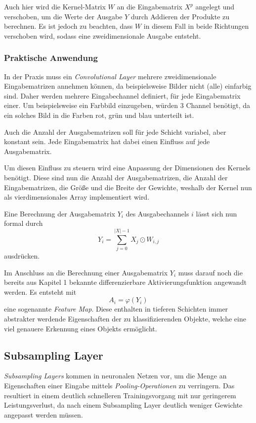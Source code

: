 \documentclass[12pt,a4]{article}
\begin{document}
Auch hier wird die Kernel-Matrix $W$ an die Eingabematrix $X^p$ angelegt und verschoben, um die Werte der Ausgabe $Y$ durch Addieren der Produkte zu berechnen. Es ist jedoch zu beachten, dass $W$ in diesem Fall in beide Richtungen verschoben wird, sodass eine zweidimensionale Ausgabe entsteht.

\subsubsection{Praktische Anwendung}\label{sec:PracticalConvolution}
In der Praxis muss ein \textit{Convolutional Layer} mehrere zweidimensionale Eingabematrizen annehmen können, da beispielsweise Bilder nicht (alle) einfarbig sind. Daher werden mehrere Eingabechannel definiert, für jede Eingabematrix einer. Um beispielsweise ein Farbbild einzugeben, würden 3 Channel benötigt, da ein solches Bild in die Farben rot, grün und blau unterteilt ist.

Auch die Anzahl der Ausgabematrizen soll für jede Schicht variabel, aber konstant sein. Jede Eingabematrix hat dabei einen Einfluss auf jede Ausgabematrix.

Um diesen Einfluss zu steuern wird eine Anpassung der Dimensionen des Kernels benötigt. Diese sind nun die Anzahl der Ausgabematrizen, die Anzahl der Eingabematrizen, die Größe und die Breite der Gewichte, weshalb der Kernel nun als vierdimensionales Array implementiert wird.

Eine Berechnung der Ausgabematrix $Y_i$ des Ausgabechannels $i$ lässt sich nun formal durch
\begin{equation}
Y_i = \sum\limits_{j=0}^{|X| - 1} X_j \odot W_{i, j}
\end{equation}
ausdrücken. 

Im Anschluss an die Berechnung einer Ausgabematrix $Y_i$ muss darauf noch die bereits aus Kapitel 1 bekannte differenzierbare Aktivierungsfunktion angewandt werden. Es entsteht mit 
\[
A_i = \varphi (Y_i)
\]
eine sogenannte \textit{Feature Map}. Diese enthalten in tieferen Schichten immer abstrakter werdende Eigenschaften der zu klassifizierenden Objekte, welche eine viel genauere Erkennung eines Objekts ermöglicht.

\subsection{Subsampling Layer}\label{sec:SubsamplingLayer}
\textit{Subsampling Layers} kommen in neuronalen Netzen vor, um die Menge an Eigenschaften einer Eingabe mittels \textit{Pooling-Operationen} zu verringern. Das resultiert in einem deutlich schnelleren Trainingsvorgang mit nur geringerem Leistungsverlust, da nach einem Subsampling Layer deutlich weniger Gewichte angepasst werden müssen.
\end{document}
